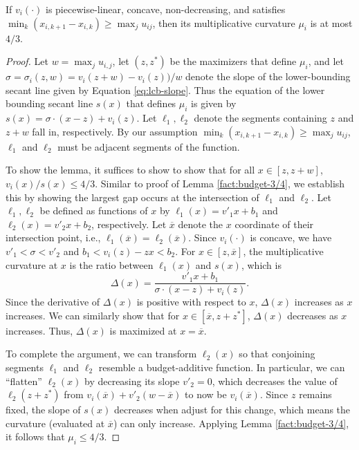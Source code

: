 \begin{lemma}
If $v_i(\cdot)$ is piecewise-linear, concave, non-decreasing, and satisfies $\min_{k}\left(x_{i,k+1} - x_{i,k}\right) \geq \max_{j} u_{ij}$, then its multiplicative curvature $\mu_i$ is at most $4/3$.
\end{lemma}




\begin{proof}
Let $w = \max_j u_{i,j}$, let $(z,z^*)$ be the maximizers that define $\mu_i$, and let 
$\sigma = \sigma_i(z,w) = v_i(z + w) - v_i(z))/w$ denote the slope of the lower-bounding 
secant line given by Equation \eqref{eq:lcb-slope}.
Thus the equation of the lower bounding secant line $s(x)$ that defines $\mu_i$ is given by 
$s(x) = \sigma \cdot(x-z) + v_i(z)$. Let  $\ell_1, \ell_2$ denote the  segments containing $z$ and $z+w$ fall in, respectively.
By our assumption $\min_{k}\left(x_{i,k+1} - x_{i,k}\right) \geq \max_{j} u_{ij}$, $\ell_1$ and $\ell_2$ must be adjacent segments of the function.



To show the lemma, it suffices to show to show that for all $x \in [z, z+w]$, $v_i(x) / s(x) \leq 4/3$. Similar to proof of Lemma \ref{fact:budget-3/4}, we establish this by showing the largest gap occurs at the intersection of $\ell_1$ and $\ell_2$. Let $\ell_1, \ell_2$ be defined as functions of $x$ by $\ell_1(x) = v'_1x+b_1$ and $\ell_2(x) = v'_2x+b_2$, respectively.
Let $\overline{x}$ denote the $x$ coordinate of their intersection point, i.e., $\ell_1(\overline{x}) = \ell_2(\overline{x})$. Since $v_i(\cdot)$ is concave, we have $v'_1 < \sigma < v'_2$ and $b_1 < v_i(z) - zx < b_2$. For $x \in [z, \overline{x}]$, the multiplicative curvature at $x$ is the ratio between $\ell_1(x)$ and $s(x)$, which is
\[
\Delta(x) = \frac{v'_1x+b_1}{\sigma \cdot (x-z) + v_i(z)}.
\]
Since the derivative of $\Delta(x)$ is positive with respect to $x$, $\Delta(x)$ increases as $x$ increases.
We can similarly show that for $x \in [\overline{x}, z+z^*]$, $\Delta(x)$ decreases as $x$ increases. Thus, $\Delta(x)$ is maximized at $x = \overline{x}$.

To complete the argument, we can transform $\ell_2(x)$ so that conjoining segments $\ell_1$ and $\ell_2$ resemble a budget-additive function. In particular, we can ``flatten'' $\ell_2(x)$ by decreasing its slope $v'_2 = 0$, which  decreases the value of $\ell_2(z+z^*)$ from $v_i(\overline{x}) + v'_2(w-\overline{x})$ to now be $v_i(\overline{x})$. Since $z$ remains fixed, the slope of $s(x)$ decreases when adjust for this change, which means the curvature (evaluated at $\overline{x}$) can only increase. Applying Lemma \ref{fact:budget-3/4}, it follows that $\mu_i \leq 4/3$.



\end{proof}

